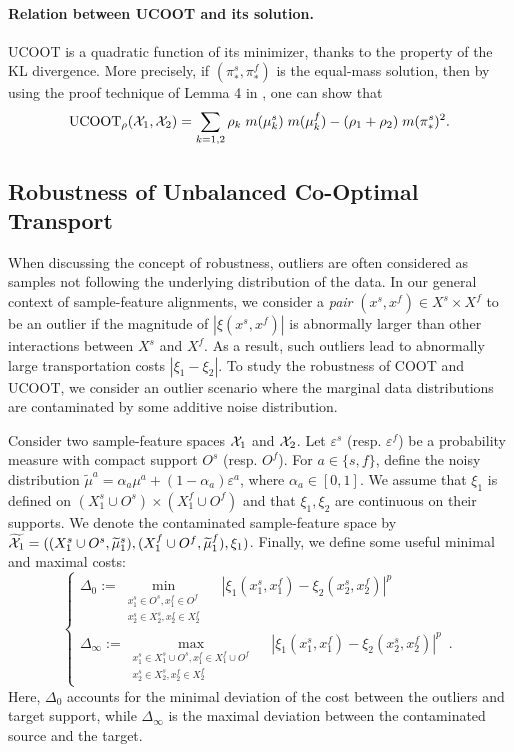 \paragraph{Relation between UCOOT and its solution.}
UCOOT is a quadratic function of its minimizer, thanks to the property of the
KL divergence. More precisely, if $(\pi_*^s, \pi_*^f)$ is the equal-mass solution,
then by using the proof technique of Lemma 4 in \citep{Khiem20}, one can show that
\begin{align}
  \label{eq:ucoot_minimizer_minimum}
  \text{UCOOT}_{\rho}(\mathcal X_1, \mathcal X_2) =
  \sum_{k=1, 2} \rho_k \; m(\mu_k^s) \; m(\mu_k^f) - (\rho_1  + \rho_2) \; m(\pi^s_*)^2.
\end{align}

\subsection{Robustness of Unbalanced Co-Optimal Transport} \label{sec:robustness}
When discussing the concept of robustness, outliers are often considered as samples
not following the underlying distribution of the data. In our general context of
sample-feature alignments, we consider a \emph{pair} $(x^s, x^f) \in X^s \times X^f$
to be an outlier if the magnitude of $|\xi(x^s, x^f)|$ is abnormally larger than
other interactions between $X^s$ and $X^f$. As a result, such outliers lead to
abnormally large transportation costs $|\xi_1 - \xi_2|$. To study the robustness of COOT and UCOOT,
we consider an outlier scenario where the marginal data distributions are contaminated
by some additive noise distribution.
\begin{assumption}
\label{assump:robust}
Consider two sample-feature spaces $\mathcal X_1$ and $\mathcal X_2$.
Let $\varepsilon^s$ (resp. $\varepsilon^f$) be a probability measure with
compact support $O^s$ (resp. $O^f$). For $a \in \{s, f\}$,
define the noisy distribution $\widetilde{\mu}^a = \alpha_a \mu^a + (1-\alpha_a) \varepsilon^a$,
where $\alpha_a \in [0,1]$. We assume that $\xi_1$ is defined on
$(X^s_1 \cup O^s) \times (X^f_1 \cup O^f)$ and
that $\xi_1, \xi_2$ are continuous on their supports.
We denote the contaminated sample-feature space by
$\widetilde{\mathcal X_1} = ((X^s_1 \cup O^s, \widetilde{\mu}^s_1), (X^f_1 \cup O^f, \widetilde{\mu}^f_1), \xi_1)$.
Finally, we define some useful minimal and maximal costs:
  \begin{equation}
    \begin{cases}
  \Delta_{0} := \min\limits_{
  \substack{
       x_1^s \in O^s, x_1^f \in O^f  \\
       x_2^s \in X_2^s, x_2^f \in X_2^f
  }}\quad |\xi_1(x_1^s, x_1^f) - \xi_2(x_2^s, x_2^f)|^p \\
  \Delta_{\infty} := \max\limits_{
  \substack{
  x_1^s \in X_1^s \cup O^s, x_1^f \in X_1^f \cup O^f \\
  x_2^s \in X_2^s, x_2^f \in X_2^f
  }} \quad|\xi_1(x_1^s, x_1^f) - \xi_2(x_2^s, x_2^f)|^p \enspace.
  \end{cases}
  \end{equation}
Here, $\Delta_{0}$ accounts for the minimal deviation of the cost between
the outliers and target support, while $\Delta_{\infty}$ is the maximal deviation
between the contaminated source and the target.
\end{assumption}
